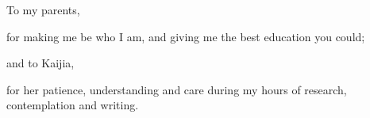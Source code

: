 
\cleardoublepage

{}

\begin{dedication}


\begin{center}
To my parents,

for making me be who I am, and giving me the best education you could;

and to Kaijia, 

for her patience, understanding and care during my hours of research, contemplation and writing.
\end{center}


\end{dedication}

